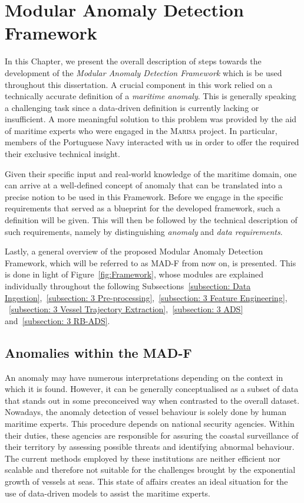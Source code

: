 \chapter{Modular Anomaly Detection Framework}
\label{chapter:Chapter 3}

In this Chapter, we present the overall description of steps towards the development of the \emph{Modular Anomaly Detection Framework} which is be used throughout this dissertation. 
A crucial component in this work relied on a technically accurate definition of a \emph{maritime anomaly}. This is generally speaking a challenging task since a data-driven definition is currently lacking or insufficient. A more meaningful solution to this problem was provided by the aid of maritime experts who were engaged in the \textsc{Marisa} project. In particular, members of the Portuguese Navy interacted with us in order to offer the required their exclusive technical insight.

Given their specific input and real-world knowledge of the maritime domain, one can arrive at a well-defined concept of anomaly that can be translated into a precise notion to be used in this Framework. Before we engage in the specific requirements that served as a blueprint for the developed framework, such a definition will be given. This will then be followed by the technical description of such requirements, namely by distinguishing \emph{anomaly} and \emph{data requirements}.

Lastly, a general overview of the proposed Modular Anomaly Detection Framework, which will be referred to as MAD-F from now on, is presented. This is done in light of Figure~\ref{fig:Framework}, whose modules are explained individually throughout the following Subsections~\ref{subsection: Data Ingestion},~\ref{subsection: 3 Pre-processing},~\ref{subsection: 3 Feature Engineering}, ~\ref{subsection: 3 Vessel Trajectory Extraction},~\ref{subsection: 3 ADS} and~\ref{subsection: 3 RB-ADS}.


\section{Anomalies within the MAD-F}
\label{section: Framework Requirements}
An anomaly may have numerous interpretations depending on the context in which it is found. However, it can be generally conceptualised as a subset of data that stands out in some preconceived way when contrasted to the overall dataset. Nowadays, the anomaly detection of vessel behaviour is solely done by human maritime experts. This procedure depends on national security agencies. Within their duties, these agencies are responsible for assuring the coastal surveillance of their territory by assessing possible threats and identifying abnormal behaviour. The current methods employed by these institutions are neither efficient nor scalable and therefore not suitable for the challenges brought by the exponential growth of vessels at seas. This state of affairs creates an ideal situation for the use of data-driven models to assist the maritime experts.

